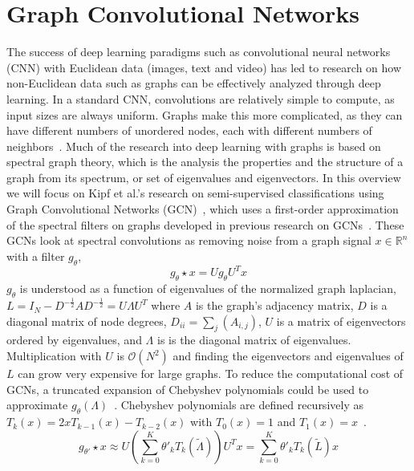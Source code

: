 
\section{Graph Convolutional Networks}

The success of deep learning paradigms such as convolutional neural networks (CNN) with Euclidean data (images, text and video) has led to research on how non-Euclidean data such as graphs can be effectively analyzed through deep learning. In a standard CNN, convolutions are relatively simple to compute, as input sizes are always uniform. Graphs make this more complicated, as they can have different numbers of unordered nodes, each with different numbers of neighbors~\cite{Wu2019}. Much of the research into deep learning with graphs is based on spectral graph theory, which is the analysis the properties and the structure of a graph from its spectrum, or set of eigenvalues and eigenvectors. In this overview we will focus on Kipf et al.'s research on semi-supervised classifications using Graph Convolutional Networks (GCN)~\cite{Kipf2016}, which uses a first-order approximation of the spectral filters on graphs developed in previous research on GCNs~\cite{Bruna2013}. These GCNs look at spectral convolutions as removing noise from a graph signal $x \in \mathbb{R}^n$ with a filter $g_\theta$,
\begin{equation}
\label{spectral_prop}
g_\theta \star x = Ug_\theta U^Tx
\end{equation}
$g_\theta$ is understood as a function of eigenvalues of the normalized graph laplacian, $L = I_N - D^{-\frac{1}{2}}AD^{-\frac{1}{2}} = U\Lambda U^T$ where $A$ is the graph's adjacency matrix, $D$ is a diagonal matrix of node degrees, $D_{ii} = \sum_{j} (A_{i,j})$, $U$ is a matrix of eigenvectors ordered by eigenvalues, and $\Lambda$ is is the diagonal matrix of eigenvalues. Multiplication with $U$ is $\mathcal{O}(N^2) $ and finding the eigenvectors and eigenvalues of $L$ can grow very expensive for large graphs. To reduce the computational cost of GCNs, a truncated expansion of Chebyshev polynomials could be used to approximate $g_\theta (\Lambda)$~\cite{Defferrard2016}.
Chebyshev polynomials are defined recursively as $T_k(x) = 2xT_{k-1}(x) - T_{k-2}(x)$ with $T_0(x) = 1$ and $T_1(x) = x$~\cite{Hammond2011}.
\begin{equation}
\label{cheby_prop}
g_{\theta'} \star x \approx U(\sum\limits_{k=0}^{K}\theta'_k T_k (\tilde{\Lambda}))U^Tx = \sum\limits_{k=0}^{K} \theta'_k T_k (\tilde{L})x
\end{equation}
